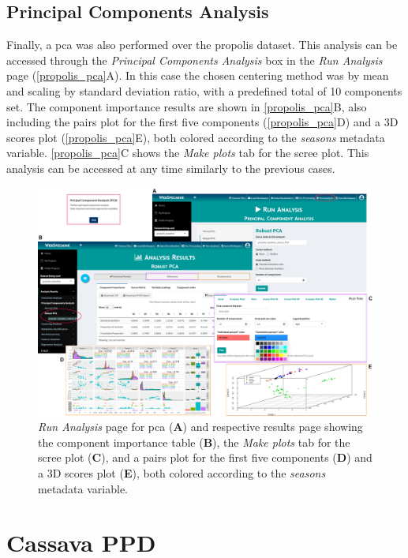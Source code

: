 \subsection{Principal Components Analysis}

Finally, a \gls{pca} was also performed over the propolis dataset. This analysis can be accessed through the \textit{Principal Components Analysis} box in the \textit{Run Analysis} page (\autoref{propolis_pca}A). In this case the chosen centering method was by mean and scaling by standard deviation ratio, with a predefined total of 10 components set. The component importance results are shown in \autoref{propolis_pca}B, also including the pairs plot for the first five components (\autoref{propolis_pca}D) and a 3D scores plot (\autoref{propolis_pca}E), both colored according to the \textit{seasons} metadata variable. \autoref{propolis_pca}C shows the \textit{Make plots} tab for the scree plot. This analysis can be accessed at any time similarly to the previous cases.

\begin{figure}[H]
	\centering
	\includegraphics[width=1\linewidth]{Imagens/Propolis/pca}
	\caption{\textit{Run Analysis} page for \gls{pca} (\textbf{A}) and respective results page showing the component importance table (\textbf{B}), the \textit{Make plots} tab for the scree plot (\textbf{C}), and a pairs plot for the first five components (\textbf{D}) and a 3D scores plot (\textbf{E}), both colored according to the \textit{seasons} metadata variable.}
	\label{propolis_pca}
\end{figure}

\newpage

\section{Cassava PPD}

